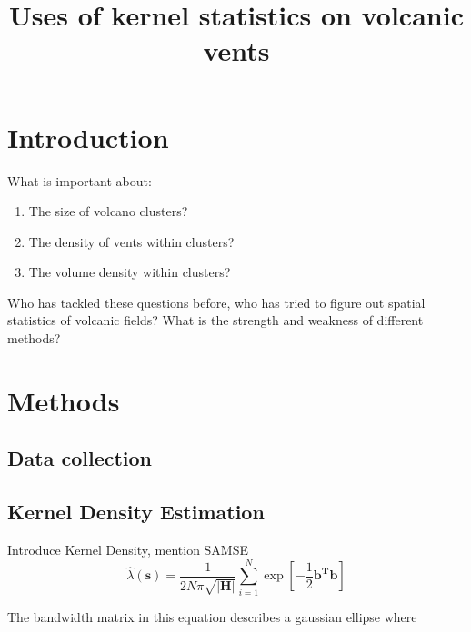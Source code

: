 \documentclass[12pt,letter]{article}
\title{Uses of kernel statistics on volcanic vents}
\date{}
\author{}
\begin{document}
\maketitle

\section{Introduction}

What is important about:
\begin{enumerate}
\item The size of volcano clusters?
\item The density of vents within clusters?
\item The volume density within clusters?
\end{enumerate}

Who has tackled these questions before, who has tried to figure out spatial statistics
of volcanic fields? What is the strength and weakness of different methods?


\section{Methods}

\subsection{Data collection}

\subsection{Kernel Density Estimation}

Introduce Kernel Density, mention SAMSE
\begin{equation}
\hat{\lambda}(\mathbf{s})=\frac{1}{2N\pi\sqrt{|\mathbf{H}|}}\sum\limits_{i=1}^{N}\exp\left[-\frac{1}{2}\mathbf{b^Tb}\right]
\label{eq_kde}
\end{equation}

The bandwidth matrix in this equation describes a gaussian ellipse where 
\end{document}
